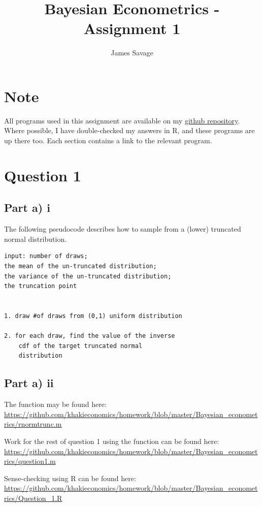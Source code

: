 \documentclass[a4paper,11pt]{article}
\title{Bayesian Econometrics - Assignment 1}
\author{James Savage}
\begin{document}
\maketitle

\section*{Note}
All programs used in this assignment are available on my \href{<www.github.com/khakieconomics>}{github repository}. Where possible, I have double-checked my answers in R, and these programs are up there too. Each section contains a link to the relevant program.



\section*{Question 1}

\subsection*{Part a) i}

The following pseudocode describes how to sample from a (lower) truncated normal distribution. 

\begin{verbatim}
input: number of draws; 
the mean of the un-truncated distribution; 
the variance of the un-truncated distribution; 
the truncation point


1. draw #of draws from (0,1) uniform distribution

2. for each draw, find the value of the inverse 
    cdf of the target truncated normal 
    distribution

\end{verbatim}

\subsection*{Part a) ii}

The function may be found here:
\url{https://github.com/khakieconomics/homework/blob/master/Bayesian_econometrics/rnormtrunc.m}

Work for the rest of question 1 using the function can be found here:
\url{https://github.com/khakieconomics/homework/blob/master/Bayesian_econometrics/question1.m}

Sense-checking using R can be found here:
\url{https://github.com/khakieconomics/homework/blob/master/Bayesian_econometrics/Question_1.R}
\end{document}
